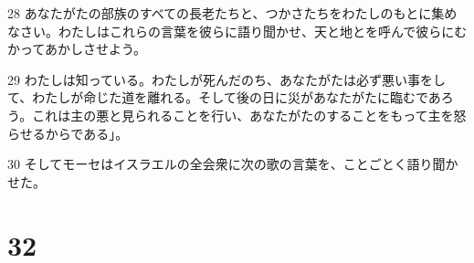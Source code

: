 \par 28 あなたがたの部族のすべての長老たちと、つかさたちをわたしのもとに集めなさい。わたしはこれらの言葉を彼らに語り聞かせ、天と地とを呼んで彼らにむかってあかしさせよう。
\par 29 わたしは知っている。わたしが死んだのち、あなたがたは必ず悪い事をして、わたしが命じた道を離れる。そして後の日に災があなたがたに臨むであろう。これは主の悪と見られることを行い、あなたがたのすることをもって主を怒らせるからである」。
\par 30 そしてモーセはイスラエルの全会衆に次の歌の言葉を、ことごとく語り聞かせた。

\chapter{32}

